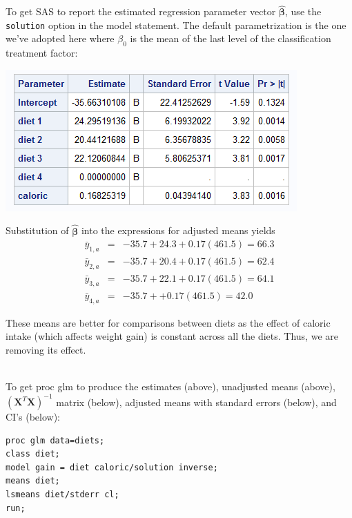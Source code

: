 \newpage

To get SAS to report the estimated regression parameter vector $\hat{\boldsymbol{\beta}}$, use the {\tt solution} option in the model statement.  The default parametrization is the one we've adopted here where $\beta_0$ is the mean of the last level of the classification treatment factor:

\begin{center}
\includegraphics{DietsEstimates}
\end{center}

Substitution of $\hat{\boldsymbol{\beta}}$ into the expressions for adjusted means yields
\begin{eqnarray*}
\bar{y}_{1,a} & = & -35.7 + 24.3 + 0.17 (461.5) = 66.3\\
\bar{y}_{2,a} & = & -35.7 + 20.4 + 0.17 (461.5) = 62.4 \\
\bar{y}_{3,a} & = & -35.7 + 22.1 + 0.17 (461.5) = 64.1 \\
\bar{y}_{4,a} & = & -35.7 + + 0.17 (461.5) = 42.0 
\end{eqnarray*} 

These means are better for comparisons between diets as the effect of caloric intake (which affects weight gain) is constant across all the diets.  Thus, we are removing its effect.\\~\\

\newpage

To get proc glm to produce the estimates (above), unadjusted means (above), $(\textbf{X}^{T}\textbf{X})^{-1}$ matrix (below), adjusted means with standard errors (below), and CI's (below):

\begin{small}
\begin{verbatim}
proc glm data=diets;
class diet;
model gain = diet caloric/solution inverse;
means diet;
lsmeans diet/stderr cl;
run;
\end{verbatim}
\end{small}

